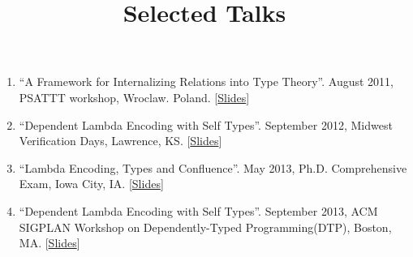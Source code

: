 \documentclass[10pt]{article}
\title{\bfseries\Large Selected Talks}
\date{}
\begin{document}
\maketitle
\vspace{-4em}

\vspace{20pt}

\begin{enumerate}

\item ``A Framework for Internalizing Relations into Type Theory''. August 2011, PSATTT workshop, Wroclaw. Poland. [\href{../../document/talks/psattt11-talk.pdf}{Slides}]
\item ``Dependent Lambda Encoding with Self Types''. September 2012, Midwest Verification Days, Lawrence, KS. [\href{../../document/talks/mvd-2012.pdf}{Slides}]
\item ``Lambda Encoding, Types and Confluence''. May 2013, Ph.D. Comprehensive Exam, Iowa City, IA. [\href{../../document/talks/comp.pdf}{Slides}]
\item ``Dependent Lambda Encoding with Self Types''. September 2013, ACM SIGPLAN Workshop on Dependently-Typed Programming(DTP), Boston, MA. [\href{../../document/talks/dtp-2013.pdf}{Slides}]
\end{enumerate}
\end{document}
